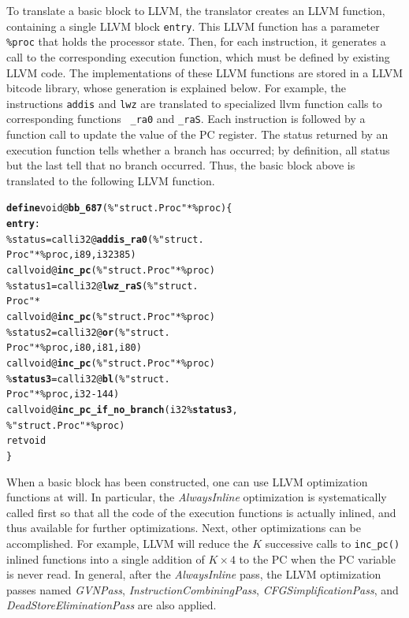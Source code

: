 \documentclass{llncs}
\begin{document}
To translate a basic block to LLVM, the translator creates an LLVM
function, containing a single LLVM block {\tt entry}. This LLVM
function has a parameter {\tt \%proc} that holds the processor
state. Then, for each instruction, it generates a call to the
corresponding execution function, which must be defined by existing
LLVM code. The implementations of these LLVM functions are stored in a
LLVM bitcode library, whose generation is explained below.  For
example, the instructions {\tt addis} and {\tt lwz} are translated to
specialized llvm function calls to corresponding functions {\tt
  \@addis\_ra0} and {\tt \@lwz\_raS}. Each instruction is followed by
a function call to update the value of the PC register. The status
returned by an execution function tells whether a branch has occurred;
by definition, all status but the last tell that no branch occurred.
Thus, the basic block above is translated to the following LLVM
function.
\begin{alltt}
  \textbf{define} void @\textbf{bb_687} (\%"struct.Proc"* \%proc) \verb|{|
  \textbf{entry}:
   \%status = call i32 @\textbf{addis\_ra0}(\%"struct.
                   Proc"* \%proc, i8 9, i32 385)
   call void @\textbf{inc_pc}(\%"struct.Proc"* \%proc)
   \%status1 = call i32 @\textbf{lwz_raS}(\%"struct.
            Proc"* %
   call void @\textbf{inc_pc}(\%"struct.Proc"* \%proc)
   \%status2 = call i32 @\textbf{or}(\%"struct.
                Proc"* \%proc, i8 0, i8 1, i8 0)
   call void @\textbf{inc_pc}(\%"struct.Proc"* \%proc)
   \%\textbf{status3} = call i32 @\textbf{bl}(\%"struct.
                        Proc"* \%proc, i32 -144)
   call void @\textbf{inc_pc_if_no_branch}(i32 \%\textbf{status3},
                         \%"struct.Proc"* \%proc)
   ret void
 \verb|}|
\end{alltt}

When a basic block has been constructed, one can use LLVM optimization
functions at will. In particular, the {\em AlwaysInline} optimization
is systematically called first so that all the code of the execution
functions is actually inlined, and thus available for further
optimizations.  Next, other optimizations can be accomplished. For
example, LLVM will reduce the $K$ successive calls to {\tt inc\_pc()}
inlined functions into a single addition of $K\times 4$ to the PC when
the PC variable is never read.  In general, after the {\em
  AlwaysInline} pass, the LLVM optimization passes named {\em
  GVNPass}, {\em InstructionCombiningPass}, {\em
  CFGSimplificationPass}, and {\em DeadStoreEliminationPass} are also
applied.
\end{document}
